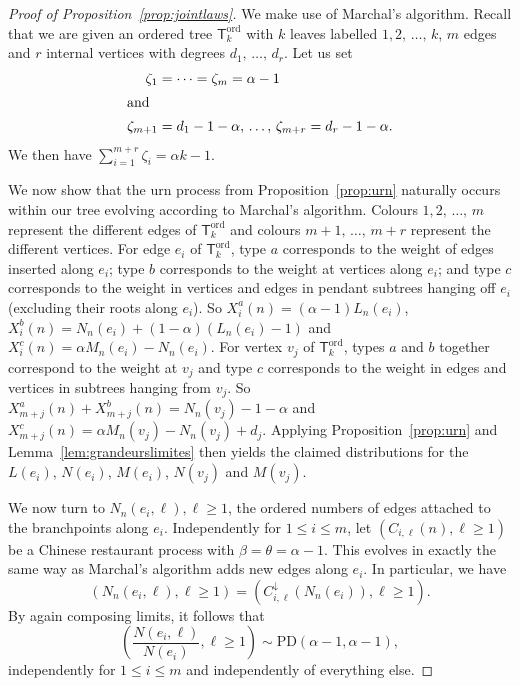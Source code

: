 \documentclass[AHL,Unicode,longabstracts,published]{cedram}
\newcommand{\ord}{\mathrm{ord}}
\newcommand{\PD}{\mathrm{PD}}
\newcommand{\sT}{\mathsf{T}}
\begin{document}
\begin{proof}[Proof of Proposition~\ref{prop:jointlaws}]
We make use of Marchal's algorithm. Recall that we are given an ordered tree $\sT_k^{\ord}$ with $k$ leaves labelled $1,2,\,\ldots,\,k$, $m$ edges and $r$ internal vertices with degrees $d_1,\,\ldots,\,d_r$. Let us set
\begin{align*}
\zeta_1 &= \cdots = \zeta_m = \alpha -1
\\
\intertext{and}
\zeta_{m+1} &= d_1 - 1 - \alpha,\,\ldots,\,\zeta_{m+r} = d_r - 1 - \alpha.
\end{align*}
We then have $ \sum_{i=1}^{m+r}\zeta_i = \alpha k - 1$.

We now show that the urn process from Proposition~\ref{prop:urn} naturally occurs within our tree evolving according to Marchal's algorithm. Colours $1, 2,\,\ldots,\,m$ represent the different edges of $\sT_k^{\ord}$ and colours $m+1,\,\ldots,\,m+r$ represent the different vertices. For edge $e_i$ of $\sT_k^{\ord}$, type $a$ corresponds to the weight of edges inserted along $e_i$; type $b$ corresponds to the weight at vertices along $e_i$; and type $c$ corresponds to the weight in vertices and edges in pendant subtrees hanging off $e_i$ (excluding their roots along $e_i$). So $X^a_i(n)=(\alpha-1) L_n(e_i)$, $X_i^b(n) = N_n(e_i) +(1-\alpha)(L_n(e_i)-1)$ and $X_i^c(n) = \alpha M_n(e_i) - N_n(e_i)$. For vertex $v_j$ of $\sT_k^{\ord}$, types $a$ and $b$ together correspond to the weight at $v_j$ and type $c$ corresponds to the weight in edges and vertices in subtrees hanging from $v_j$. So $X^a_{m+j}(n) + X^b_{m+j}(n) = N_n(v_j) -1 - \alpha$ and $X_{m+j}^c(n) =
\alpha M_n(v_j) - N_n(v_j)+d_j$. Applying Proposition~\ref{prop:urn} and Lemma~\ref{lem:grandeurslimites} then yields the claimed distributions for the $L(e_i)$, $N(e_i)$, $M(e_i)$, $N(v_j)$ and $M(v_j)$.

We now turn to $N_n(e_i,\ell), \ell \ge 1$, the ordered numbers of edges attached to the branchpoints along $e_i$. Independently for $1 \le i \le m$, let $(C_{i, \ell}(n), \ell \ge 1)$ be a Chinese restaurant process with $\beta = \theta = \alpha -1$. This evolves in exactly the same way as Marchal's algorithm adds new edges along $e_i$. In particular, we have
\[
\left(N_n\left(e_i,\ell\right), \ell \ge 1\right) = \left(C^{\downarrow}_{i,\ell}\left(N_n(e_i)\right), \ell \ge 1\right).
\]
By again composing limits, it follows that
\[
\left(\frac{N\left(e_i,\ell\right)}{N\left(e_i\right)}, \ell \ge 1\right) \sim \PD(\alpha-1,\alpha-1),
\]
independently for $1 \le i \le m$ and independently of everything else.


\end{proof}
\end{document}
